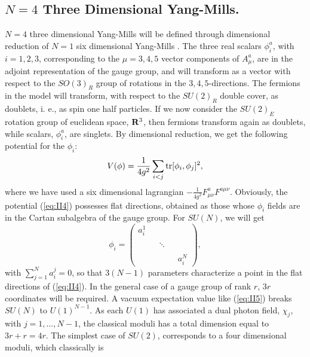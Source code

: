 \subsection{$N\!=\!4$ Three Dimensional Yang-Mills.}
\label{sec:22}

$N\!=\!4$ three dimensional Yang-Mills will be defined through
dimensional reduction of $N\!=\!1$ six dimensional Yang-Mills \cite{SW3d}.
The three real scalars $\phi_i^{a}$, with $i=1,2,3$,
corresponding to the $\mu=3,4,5$ vector components of
$A_{\mu}^{a}$, are in the adjoint representation of the gauge group, and
will transform as a vector with respect to the $SO(3)_R$ group of
rotations in the $3,4,5$-directions. The fermions in the model
will transform, with respect to the $SU(2)_R$ double cover, as
doublets, i. e., as spin one half particles. If we now consider
the $SU(2)_E$ rotation group of euclidean space, ${\bf R}^3$,
then fermions transform again as doublets, while scalars,
$\phi_i^{a}$, are singlets. By dimensional reduction, we get the
following potential for the $\phi_i$:
\begin{equation}
V(\phi) = \frac {1}{4g^2} \sum_{i<j} \hbox {tr}
[\phi_i,\phi_j]^2, 
\label{eq:II4}
\end{equation}
where we have used a six dimensional lagrangian 
$- \frac {1}{4g^2} F_{\mu \nu}^{a} F^{a \mu \nu}$. Obviously,
the potential (\ref{eq:II4}) possesses flat directions, obtained
as those whose $\phi_i$ fields are in the Cartan subalgebra of
the gauge group. For $SU(N)$, we will get
\begin{equation}
\phi_i = \left( \begin{array}{ccccc} a_i^1   &   &    &   &    \\
					     &   &    &   &    \\
					     &   &  \ddots  &   &    \\
					     &   &    &   &    \\
					     &   &    &   & a_i^N 
	\end{array} \right), 
\label{eq:II5}
\end{equation}
with $\sum_{j=1}^{N} a_i^{j} = 0$, so that $3(N-1)$
parameters characterize a point in the flat directions of
(\ref{eq:II4}). In the general case of a gauge group of rank $r$,
$3r$ coordinates will be required. A vacuum expectation value
like (\ref{eq:II5}) breaks $SU(N)$ to $U(1)^{N-1}$. As each
$U(1)$ has associated a dual photon field, $\chi_j$, with
$j=1,\ldots, N-1$, the classical moduli has a total
dimension equal to $3r+r=4r$. The simplest case of $SU(2)$,
corresponds to a four dimensional moduli, which classically is
